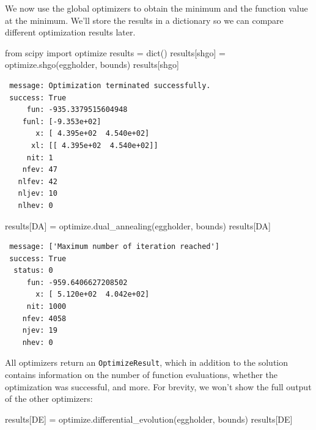\documentclass[
  letterpaper,
  DIV=11,
  numbers=noendperiod]{scrreprt}
\newenvironment{Shaded}{\begin{snugshade}}{\end{snugshade}}
\newcommand{\BuiltInTok}[1]{\textcolor[rgb]{0.00,0.23,0.31}{#1}}
\newcommand{\ImportTok}[1]{\textcolor[rgb]{0.00,0.46,0.62}{#1}}
\newcommand{\NormalTok}[1]{\textcolor[rgb]{0.00,0.23,0.31}{#1}}
\newcommand{\OperatorTok}[1]{\textcolor[rgb]{0.37,0.37,0.37}{#1}}
\newcommand{\StringTok}[1]{\textcolor[rgb]{0.13,0.47,0.30}{#1}}
\begin{document}
We now use the global optimizers to obtain the minimum and the function
value at the minimum. We'll store the results in a dictionary so we can
compare different optimization results later.

\begin{Shaded}
\begin{Highlighting}[]
\ImportTok{from}\NormalTok{ scipy }\ImportTok{import}\NormalTok{ optimize}
\NormalTok{results }\OperatorTok{=} \BuiltInTok{dict}\NormalTok{()}
\NormalTok{results[}\StringTok{\textquotesingle{}shgo\textquotesingle{}}\NormalTok{] }\OperatorTok{=}\NormalTok{ optimize.shgo(eggholder, bounds)}
\NormalTok{results[}\StringTok{\textquotesingle{}shgo\textquotesingle{}}\NormalTok{]}
\end{Highlighting}
\end{Shaded}

\begin{verbatim}
 message: Optimization terminated successfully.
 success: True
     fun: -935.3379515604948
    funl: [-9.353e+02]
       x: [ 4.395e+02  4.540e+02]
      xl: [[ 4.395e+02  4.540e+02]]
     nit: 1
    nfev: 47
   nlfev: 42
   nljev: 10
   nlhev: 0
\end{verbatim}

\begin{Shaded}
\begin{Highlighting}[]
\NormalTok{results[}\StringTok{\textquotesingle{}DA\textquotesingle{}}\NormalTok{] }\OperatorTok{=}\NormalTok{ optimize.dual\_annealing(eggholder, bounds)}
\NormalTok{results[}\StringTok{\textquotesingle{}DA\textquotesingle{}}\NormalTok{]}
\end{Highlighting}
\end{Shaded}

\begin{verbatim}
 message: ['Maximum number of iteration reached']
 success: True
  status: 0
     fun: -959.6406627208502
       x: [ 5.120e+02  4.042e+02]
     nit: 1000
    nfev: 4058
    njev: 19
    nhev: 0
\end{verbatim}

All optimizers return an \texttt{OptimizeResult}, which in addition to
the solution contains information on the number of function evaluations,
whether the optimization was successful, and more. For brevity, we won't
show the full output of the other optimizers:

\begin{Shaded}
\begin{Highlighting}[]
\NormalTok{results[}\StringTok{\textquotesingle{}DE\textquotesingle{}}\NormalTok{] }\OperatorTok{=}\NormalTok{ optimize.differential\_evolution(eggholder, bounds)}
\NormalTok{results[}\StringTok{\textquotesingle{}DE\textquotesingle{}}\NormalTok{]}
\end{Highlighting}
\end{Shaded}
\end{document}
